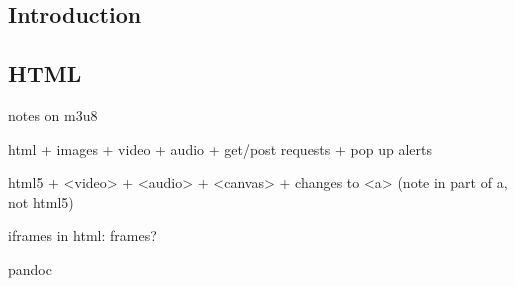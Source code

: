 
\subsection{Introduction}

\subsection{HTML}
notes on m3u8

html
+ images
+ video
+ audio
+ get/post requests
+ pop up alerts


html5
+ <video>
+ <audio>
+ <canvas>
+ changes to <a> (note in part of a, not html5)


iframes
in html: frames?

pandoc

